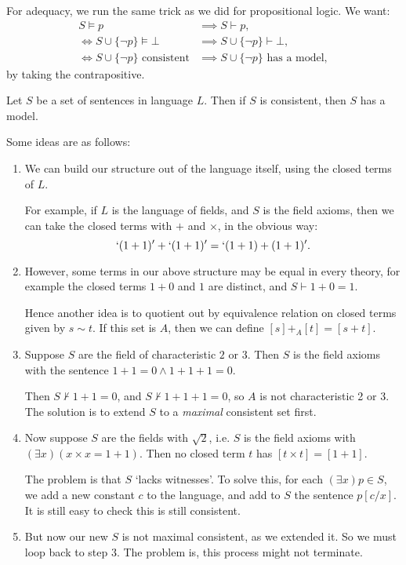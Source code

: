 \documentclass[12pt]{article}
\begin{document}
For adequacy, we run the same trick as we did for propositional logic. We want:
\begin{align*}
	S \models p &\implies S \vdash p, \\
	\iff S \cup \{\neg p\} \models \bot &\implies S \cup \{\neg p\} \vdash \bot, \\
	\iff S \cup \{\neg p\} \text{ consistent} &\implies S \cup \{\neg p\} \text{ has a model},
\end{align*}
by taking the contrapositive.

\begin{theorem}
	Let $S$ be a set of sentences in language $L$. Then if $S$ is consistent, then $S$ has a model.
\end{theorem}

Some ideas are as follows:
\begin{enumerate}
	\item We can build our structure out of the language itself, using the closed terms of $L$.

		For example, if $L$ is the language of fields, and $S$ is the field axioms, then we can take the closed terms with $+$ and $\times$, in the obvious way:
		\[
		`(1+1)' + `(1+1)' = `(1+1) + (1+1)'.
		\]
	\item However, some terms in our above structure may be equal in every theory, for example the closed terms $1 + 0$ and $1$ are distinct, and $S \vdash 1 + 0 = 1$.

		Hence another idea is to quotient out by equivalence relation on closed terms given by $s \sim t$. If this set is $A$, then we can define $[s] +_A [t] = [s+t]$.
	\item Suppose $S$ are the field of characteristic $2$ or $3$. Then $S$ is the field axioms with the sentence $1 + 1 = 0 \wedge 1 + 1 + 1 = 0$.

		Then $S \not \vdash 1 + 1 = 0$, and $S \not \vdash 1 + 1 + 1 = 0$, so $A$ is not characteristic 2 or 3. The solution is to extend $S$ to a \emph{maximal} consistent set first.
	\item Now suppose $S$ are the fields with $\sqrt 2$, i.e. $S$ is the field axioms with $(\exists x)(x \times x = 1 + 1)$. Then no closed term $t$ has $[t \times t] = [1 + 1]$.

		The problem is that $S$ `lacks witnesses'. To solve this, for each $(\exists x)p \in S$, we add a new constant $c$ to the language, and add to $S$ the sentence $p[c/x]$. It is still easy to check this is still consistent.
	\item But now our new $S$ is not maximal consistent, as we extended it. So we must loop back to step 3. The problem is, this process might not terminate.
\end{enumerate}
\end{document}
